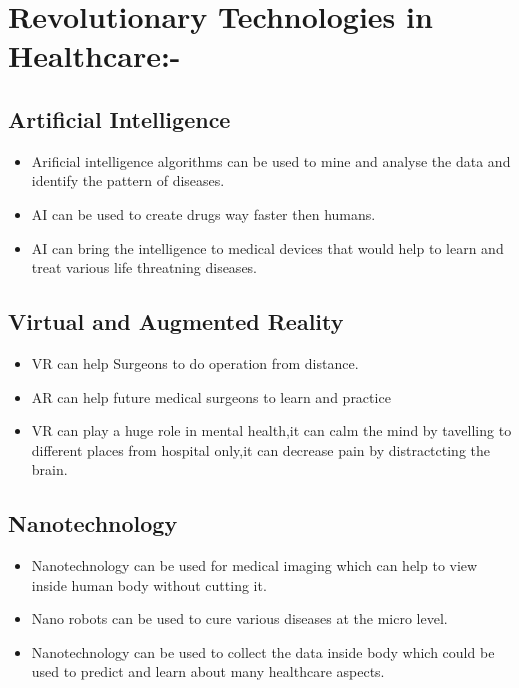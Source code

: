 \documentclass[12pt]{article}
\begin{document}
\section{Revolutionary Technologies in Healthcare:-}


\subsection{Artificial Intelligence }
\begin{itemize}
\item Arificial intelligence algorithms can be used to mine and analyse the data and identify the pattern of diseases.
\item AI can be used to create drugs way faster then humans.
\item AI can bring the intelligence to medical devices that would help to learn and treat various life threatning diseases.
\end{itemize}
\subsection{Virtual and Augmented Reality}
\begin{itemize}


\item VR can help Surgeons to do operation from distance.
\item AR can help future medical surgeons to learn and practice
\item VR can play a huge role in mental health,it can calm the mind by tavelling to different places from hospital only,it can decrease pain by distractcting the brain.
\end{itemize}
\subsection{Nanotechnology}

\begin{itemize}

\item Nanotechnology can be used for medical imaging which can help to view inside human body without cutting it.
\item Nano robots can be used to cure various diseases at the micro level.
\item Nanotechnology can be used to collect the data inside body which could be used to predict and learn about many healthcare aspects.
\end{itemize}
\end{document}
